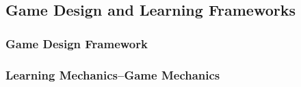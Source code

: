 \subsection{Game Design and Learning Frameworks}

\subsubsection{Game Design Framework}

\subsubsection{Learning Mechanics–Game Mechanics}